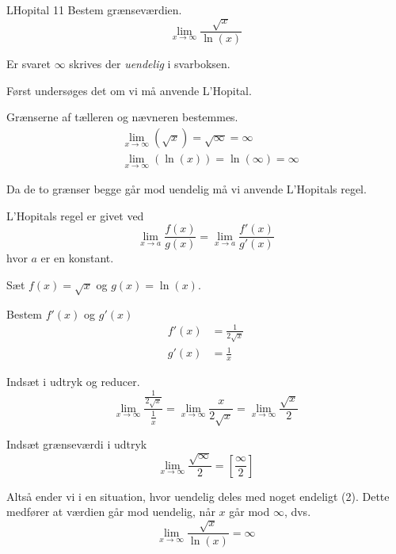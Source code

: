 \documentclass{article}
\begin{document}
\begin{exercise}{LHopital 11}
Bestem grænseværdien.
\[
\lim_{x \to \infty} \frac{\sqrt{x}}{\ln(x)}
\] 

Er svaret $\infty$ skrives der \emph{uendelig} i svarboksen.


\hint
Først undersøges det om vi må anvende L'Hopital.

\hint
Grænserne af tælleren og nævneren bestemmes.
\begin{align*}
	&\lim_{x \to \infty} (\sqrt{x}) = \sqrt{\infty} = \infty \\
	&\lim_{x \to \infty} (\ln(x)) = \ln(\infty) = \infty
\end{align*}

\hint
Da de to grænser begge går mod uendelig må vi  anvende L'Hopitals regel. 

\hint
L'Hopitals regel er givet ved
\[
\lim_{x \to a} \frac{f(x)}{g(x)} = \lim_{x \to a} \frac{f'(x)}{g'(x)} 
\]
hvor $a$  er en konstant.

\hint
Sæt $f(x) = \sqrt{x}$ og $g(x) = \ln(x)$. 

\hint
Bestem $f'(x)$ og $g'(x)$
\begin{align*}
	f'(x) &= \frac{1}{2\sqrt{x}} \\
	g'(x) &= \frac{1}{x}
\end{align*}

\hint
Indsæt i udtryk og reducer. 
\[
\lim_{x \to \infty} \frac{ \frac{1}{2 \sqrt{x}} }{ \frac{1}{x} } = \lim_{x \to \infty} \frac{x}{2 \sqrt{x}} = 	\lim_{x \to \infty} \frac{\sqrt{x}}{2}
\]

\hint
Indsæt grænseværdi i udtryk
\[
\lim_{x \to \infty} \frac{\sqrt{\infty}}{2}  = \left[ \frac{\infty}{2}  \right] 
\]

\hint
Altså ender vi i en situation, hvor uendelig deles med noget endeligt (2). Dette medfører at værdien går mod uendelig, når $x$ går mod $\infty$, dvs.
\[
\lim_{x \to \infty} \frac{\sqrt{x}}{\ln(x)} = \infty
\]

\end{exercise}
\end{document}
